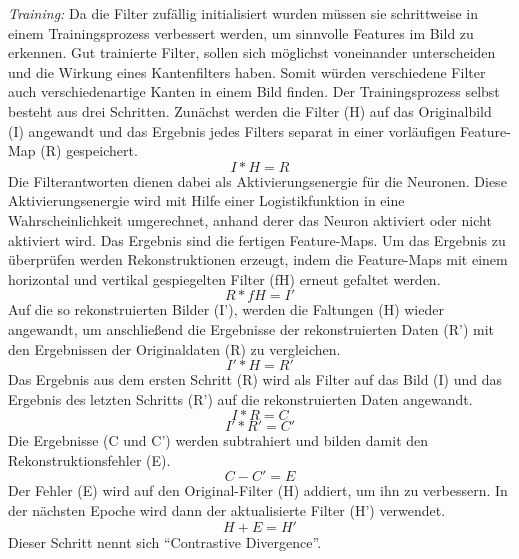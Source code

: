 \textit{Training:}
Da die Filter zufällig initialisiert wurden müssen sie schrittweise in einem Trainingsprozess verbessert werden, um sinnvolle Features im Bild zu erkennen.
Gut trainierte Filter, sollen sich möglichst voneinander unterscheiden und die Wirkung eines Kantenfilters haben.
Somit würden verschiedene Filter auch verschiedenartige Kanten in einem Bild finden.
Der Trainingsprozess selbst besteht aus drei Schritten.
Zunächst werden die Filter (H) auf das Originalbild (I) angewandt und das Ergebnis jedes Filters separat in einer vorläufigen Feature-Map (R) gespeichert.
\begin{equation*}
I * H = R
\end{equation*}
Die Filterantworten dienen dabei als Aktivierungsenergie für die Neuronen.
Diese Aktivierungsenergie wird mit Hilfe einer Logistikfunktion in eine Wahrscheinlichkeit umgerechnet, anhand derer das Neuron aktiviert oder nicht aktiviert wird.
Das Ergebnis sind die fertigen Feature-Maps.
Um das Ergebnis zu überprüfen werden Rekonstruktionen erzeugt, indem die Feature-Maps mit einem horizontal und vertikal gespiegelten Filter (fH) erneut gefaltet werden.
\begin{equation*}
R * fH = I'
\end{equation*}
Auf die so rekonstruierten Bilder (I'), werden die Faltungen (H) wieder angewandt, um anschließend die Ergebnisse der rekonstruierten Daten (R') mit den Ergebnissen der Originaldaten (R) zu vergleichen.
\begin{equation*}
I' * H = R'
\end{equation*}
Das Ergebnis aus dem ersten Schritt (R) wird als Filter auf das Bild (I) und das Ergebnis des letzten Schritts (R') auf die rekonstruierten Daten angewandt.
\begin{equation*}
I * R = C
\end{equation*}
\begin{equation*}
I' * R' = C'
\end{equation*}
Die Ergebnisse (C und C') werden subtrahiert und bilden damit den Rekonstruktionsfehler (E).
\begin{equation*}
C - C' = E
\end{equation*}
Der Fehler (E) wird auf den Original-Filter (H) addiert, um ihn zu verbessern.
In der nächsten Epoche wird dann der aktualisierte Filter (H') verwendet.
\begin{equation*}
H + E = H'
\end{equation*}
Dieser Schritt nennt sich "`Contrastive Divergence"'.

